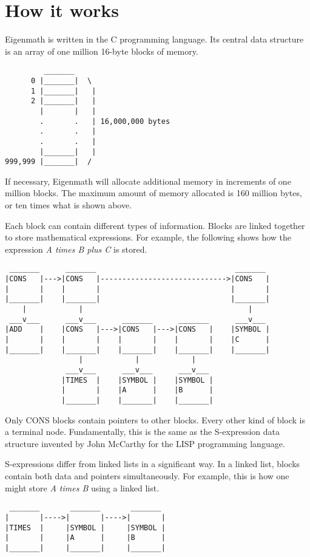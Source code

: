 \chapter{How it works}

Eigenmath is written in the C programming language.
Its central data structure is
an array of one million 16-byte blocks of memory.
\begin{verbatim}
         _______ 
      0 |_______|  \
      1 |_______|   |
      2 |_______|   |
        |       |   |
        .       .   | 16,000,000 bytes
        .       .   |
        .       .   |
        |_______|   |
999,999 |_______|  /
\end{verbatim}
If necessary, Eigenmath will allocate additional memory in increments of one
million blocks.
The maximum amount of memory allocated is 160 million bytes,
or ten times what is shown above.

\newpage

\noindent
Each block can contain different types of information.
Blocks are linked together to store mathematical expressions.
For example, the following shows how the expression
{\it A times B plus C} is stored.
\begin{verbatim}
 _______      _______                                _______
|CONS   |--->|CONS   |----------------------------->|CONS   |
|       |    |       |                              |       |
|_______|    |_______|                              |_______|
    |            |                                      |
 ___v___      ___v___      _______      _______      ___v___
|ADD    |    |CONS   |--->|CONS   |--->|CONS   |    |SYMBOL |
|       |    |       |    |       |    |       |    |C      |
|_______|    |_______|    |_______|    |_______|    |_______|
                 |            |            |
              ___v___      ___v___      ___v___
             |TIMES  |    |SYMBOL |    |SYMBOL |
             |       |    |A      |    |B      |
             |_______|    |_______|    |_______|
\end{verbatim}
Only CONS blocks contain pointers to other blocks.
Every other kind of block is a terminal node.
Fundamentally, this is the same as the S-expression data structure invented by
John McCarthy for the
LISP programming language.

\medskip
\noindent
S-expressions differ from linked lists in a significant way.
In a linked list, blocks contain both data and pointers simultaneously.
For example, this is how one might store {\it A times B} using a linked list.
\begin{verbatim}
 _______       _______       _______
|       |---->|       |---->|       |
|TIMES  |     |SYMBOL |     |SYMBOL |
|       |     |A      |     |B      |
|_______|     |_______|     |_______|
\end{verbatim}

